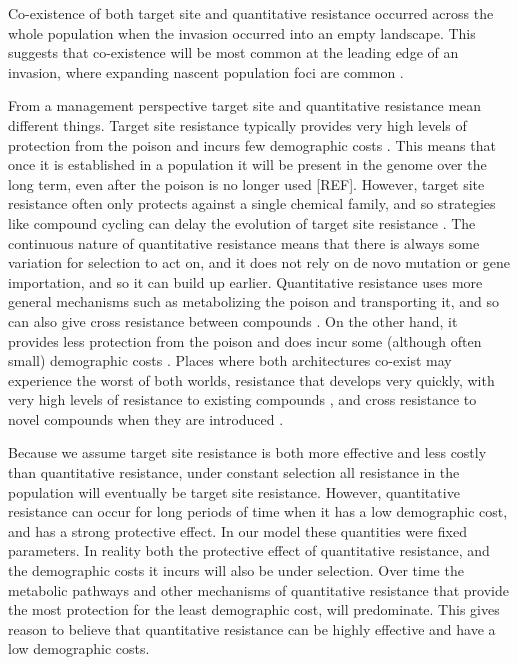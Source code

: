 \documentclass[10pt,letterpaper]{article}
\begin{document}
Co-existence of both target site and quantitative resistance occurred across the whole population when the invasion occurred into an empty landscape. This suggests that co-existence will be most common at the leading edge of an invasion, where expanding nascent population foci are common \cite{Mooy1988}.

From a management perspective target site and quantitative resistance mean different things. Target site resistance typically provides very high levels of protection from the poison and incurs few demographic costs \cite{Bauc2016}. This means that once it is established in a population it will be present in the genome over the long term, even after the poison is no longer used [REF]. However, target site resistance often only protects against a single chemical family, and so strategies like compound cycling can delay the evolution of target site resistance \cite{Rex2013}. The continuous nature of quantitative resistance means that there is always some variation for selection to act on, and it does not rely on de novo mutation or gene importation, and so it can build up earlier. Quantitative resistance uses more general mechanisms such as metabolizing the poison and transporting it, and so can also give cross resistance between compounds \cite{Bauc2016, Neve2007}. On the other hand, it provides less protection from the poison and does incur some (although often small) demographic costs \cite{Bauc2016}. Places where both architectures co-exist may experience the worst of both worlds, resistance that develops very quickly, with very high levels of resistance to existing compounds \cite{Vera2015}, and cross resistance to novel compounds when they are introduced \cite{Neve2007}.   
                         
Because we assume target site resistance is both more effective and less costly than quantitative resistance, under constant selection all resistance in the population will eventually be target site resistance. However, quantitative resistance can occur for long periods of time when it has a low demographic cost, and has a strong protective effect. In our model these quantities were fixed parameters. In reality both the protective effect of quantitative resistance, and the demographic costs it incurs will also be under selection. Over time the metabolic pathways and other mechanisms of quantitative resistance that provide the most protection for the least demographic cost, will predominate. This gives reason to believe that quantitative resistance can be highly effective and have a low demographic costs.    
\end{document}
